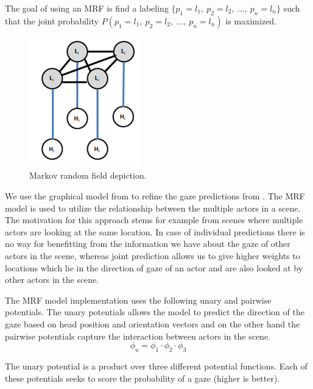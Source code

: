 \documentclass[10pt,twocolumn,letterpaper]{article}
\begin{document}
\pagebreak

The goal of using an MRF is find a labeling $\{p_1 = l_1,\ p_2 = l_2,\ \dots,\ p_n = l_n\}$ such that the joint probability $P(p_1 = l_1,\ p_2 = l_2,\ \dots,\ p_n = l_n)$ is maximized.

\begin{figure}[H]
  \begin{center}
    \includegraphics[width=0.3\linewidth]{images/mrf_model.png}
  \end{center}
  \vspace{-0.3cm}
   \caption{Markov random field depiction.}
  \vspace{-0.5cm}
\end{figure}


We use the graphical model from \cite{fathi2012social} to refine the gaze predictions from \cite{nips15_recasens}. The MRF model is used to utilize the relationship between the multiple actors in a scene. The motivation for this approach stems for example from scenes where multiple actors are looking at the same location. In case of individual predictions there is no way for benefitting from the information we have about the gaze of other actors in the scene, whereas joint prediction allows us to give higher weights to locations which lie in the direction of gaze of an actor and are also looked at by other actors in the scene.

The MRF model implementation uses the following unary and pairwise potentials. The unary potentials allows the model to predict the direction of the gaze based on head position and orientation vectors and on the other hand the pairwise potentials capture the interaction between actors in the scene. \\

\begin{equation}
  \phi_u = \phi_1 \cdot \phi_2 \cdot \phi_3
\end{equation}

The unary potential is a product over three different potential functions. Each of these potentials seeks to score the probability of a gaze (higher is better).
\end{document}
